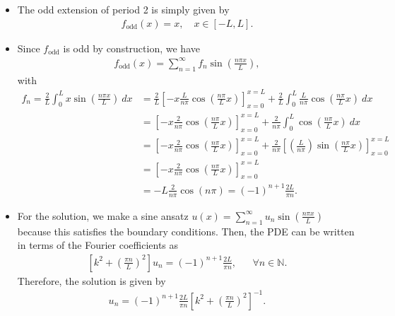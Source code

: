 \documentclass[11pt]{article}
\begin{document}
\begin{solution}
    \begin{itemize}
        \item The odd extension of period 2 is simply given by
        \begin{align*}
            f_{\mathrm{odd}}(x) = x, \quad x \in [-L,L].
        \end{align*}
        \item 
        Since $f_{\mathrm{odd}}$ is odd by construction, we have
        \begin{align*}
            f_{\mathrm{odd}}(x) = \sum_{n=1}^{\infty} f_n \sin(\frac{n \pi x}{L}),
        \end{align*}
        with
        \begin{align*}
            f_n 
            = 
            \frac{2}{L} \int_{0}^{L} x \sin(\frac{n \pi x}{L}) \ dx 
            &
            = 
            \frac{2}{L} 
            \left[ -x \frac{L}{n \pi} \cos\left( \frac{n \pi}{L} x \right) \right]_{x=0}^{x=L} 
            +
            \frac{2}{L} 
            \int_{0}^{L} \frac{L}{n \pi} \cos\left( \frac{n \pi}{L} x \right) \ dx 
            \\&
            = 
            \left[ -x \frac{2}{n \pi} \cos\left( \frac{n \pi}{L} x \right) \right]_{x=0}^{x=L} 
            +
            \frac{2}{n \pi} 
            \int_{0}^{L} \cos\left( \frac{n \pi}{L} x \right) \ dx 
            \\&
            = 
            \left[ -x \frac{2}{n \pi} \cos\left( \frac{n \pi}{L} x \right) \right]_{x=0}^{x=L} 
            +
            \frac{2}{n \pi} 
            \left[ \left( \frac{L}{n \pi} \right) \sin\left( \frac{n \pi}{L} x \right) \right]_{x=0}^{x=L} 
            \\&
            = 
            \left[ -x \frac{2}{n \pi} \cos\left( \frac{n \pi}{L} x \right) \right]_{x=0}^{x=L} 
            \\&
            = 
            -L \frac{2}{n \pi} \cos\left( n \pi \right)
            =
            (-1)^{n+1}\frac{2L}{\pi n}
            .
        \end{align*}
        \item 
        For the solution, we make a sine ansatz $u(x) = \sum_{n=1}^{\infty} u_n \sin(\frac{n \pi x}{L})$ 
        because this satisfies the boundary conditions. 
        Then, the PDE can be written in terms of the Fourier coefficients as
        \begin{align*}
            \left[ k^2 + \left(\frac{\pi n}{L} \right)^2 \right] u_n = (-1)^{n+1}\frac{2L}{\pi n}, & & \forall n \in \mathbb{N}.
        \end{align*}
        Therefore, the solution is given by
        \begin{align*}
            u_n 
            = 
            (-1)^{n+1}\frac{2L}{\pi n} 
            \left[ k^2 + \left(\frac{\pi n}{L} \right)^2 \right]^{-1}
            .
        \end{align*}
    \end{itemize}
\end{solution}
\end{document}

